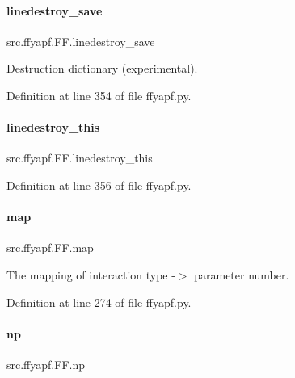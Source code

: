 \paragraph{\texorpdfstring{linedestroy\+\_\+save}{linedestroy\_save}}
{\footnotesize\ttfamily src.\+ffyapf.\+F\+F.\+linedestroy\+\_\+save}



Destruction dictionary (experimental). 



Definition at line 354 of file ffyapf.\+py.

\mbox{\label{classsrc_1_1ffyapf_1_1FF_a045adc994f0b33cfe27ec9e07faef38f}} 
\paragraph{\texorpdfstring{linedestroy\+\_\+this}{linedestroy\_this}}
{\footnotesize\ttfamily src.\+ffyapf.\+F\+F.\+linedestroy\+\_\+this}



Definition at line 356 of file ffyapf.\+py.

\mbox{\label{classsrc_1_1ffyapf_1_1FF_ac0187f2700fff8b52387d1a9461bfacf}} 
\paragraph{\texorpdfstring{map}{map}}
{\footnotesize\ttfamily src.\+ffyapf.\+F\+F.\+map}



The mapping of interaction type -\/$>$ parameter number. 



Definition at line 274 of file ffyapf.\+py.

\mbox{\label{classsrc_1_1ffyapf_1_1FF_a29e74447e815d30b95c0fdb6beb56bbb}} 
\paragraph{\texorpdfstring{np}{np}}
{\footnotesize\ttfamily src.\+ffyapf.\+F\+F.\+np}



